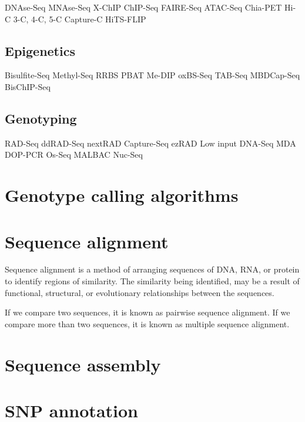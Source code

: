 \documentclass[
]{book}
\begin{document}
DNAse-Seq
MNAse-Seq
X-ChIP
ChIP-Seq
FAIRE-Seq
ATAC-Seq
Chia-PET
Hi-C
3-C, 4-C, 5-C
Capture-C
HiTS-FLIP

\hypertarget{epigenetics}{%
\subsection{Epigenetics}\label{epigenetics}}

Bisulfite-Seq
Methyl-Seq
RRBS
PBAT
Me-DIP
oxBS-Seq
TAB-Seq
MBDCap-Seq
BisChIP-Seq

\hypertarget{genotyping}{%
\subsection{Genotyping}\label{genotyping}}

RAD-Seq
ddRAD-Seq
nextRAD
Capture-Seq
ezRAD
Low input DNA-Seq
MDA
DOP-PCR
Os-Seq
MALBAC
Nuc-Seq

\hypertarget{genotype-calling-algorithms}{%
\section{Genotype calling algorithms}\label{genotype-calling-algorithms}}

\hypertarget{sequence-alignment}{%
\section{Sequence alignment}\label{sequence-alignment}}

Sequence alignment is a method of arranging sequences of DNA, RNA, or protein to identify regions of similarity. The similarity being identified, may be a result of functional, structural, or evolutionary relationships between the sequences.

If we compare two sequences, it is known as pairwise sequence alignment. If we compare more than two sequences, it is known as multiple sequence alignment.

\hypertarget{sequence-assembly}{%
\section{Sequence assembly}\label{sequence-assembly}}

\hypertarget{snp-annotation}{%
\section{SNP annotation}\label{snp-annotation}}
\end{document}
